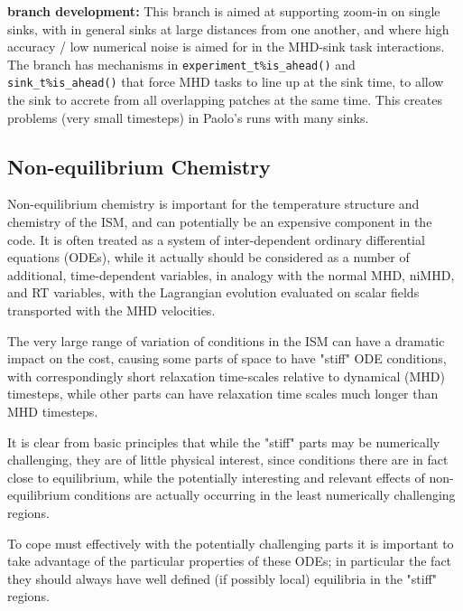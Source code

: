 \documentclass[paper=a4,fontsize=11pt]{scrartcl}
\numberwithin{equation}{section}		%
\numberwithin{figure}{section}			%
\numberwithin{table}{section}				%
\begin{document}
\textbf{branch development:} This branch is aimed at supporting zoom-in on single sinks, with in general sinks at large distances from one another, and where high accuracy / low numerical noise is aimed for in the MHD-sink task interactions.  The branch has mechanisms in \verb|experiment_t%is_ahead()| and \verb|sink_t%is_ahead()| that force MHD tasks to line up at the sink time, to allow the sink to accrete from all overlapping patches at the same time.   This creates problems (very small timesteps) in Paolo's runs with many sinks.

\subsection{Non-equilibrium Chemistry}
Non-equilibrium chemistry is important for the temperature structure and chemistry of the ISM, and can potentially be an expensive component in the code.  It is often treated as a system of inter-dependent ordinary differential equations (ODEs), while it actually should be considered as a number of additional, time-dependent variables, in analogy with the normal MHD, niMHD, and RT variables, with the Lagrangian evolution evaluated on scalar fields transported with the MHD velocities.

The very large range of variation of conditions in the ISM can have a dramatic impact on the cost, causing some parts of space to have "stiff" ODE conditions, with correspondingly short relaxation time-scales relative to dynamical (MHD) timesteps, while other parts can have relaxation time scales much longer than MHD timesteps.

It is clear from basic principles that while the "stiff" parts may be numerically challenging, they are of little physical interest, since conditions there are in fact close to equilibrium, while the potentially interesting and relevant effects of non-equilibrium conditions are actually occurring in the least numerically challenging regions.

To cope must effectively with the potentially challenging parts it is important to take advantage of the particular properties of these ODEs; in particular the fact they should always have well defined (if possibly local) equilibria in the "stiff" regions.

\end{document}
